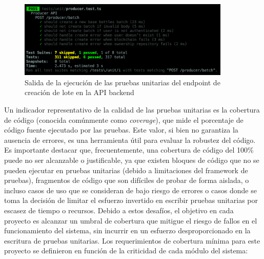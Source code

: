 \begin{figure}[!htb]
	\centering
	\includegraphics[width=0.9\textwidth]{Figures/unit-test-api-results.png}
	\caption{Salida de la ejecución de las pruebas unitarias del \gls{endpoint} de creación de lote en la API backend}
	\label{fig:unit-test-api-results}
\end{figure}

Un indicador representativo de la calidad de las pruebas unitarias es la cobertura de código (conocida comúnmente como \textit{\gls{coverage}}), que mide el porcentaje de código fuente ejecutado por las pruebas. Este valor, si bien no garantiza la ausencia de errores, es una herramienta útil para evaluar la robustez del código. Es importante destacar que, frecuentemente, una cobertura de código del 100\% puede no ser alcanzable o justificable, ya que existen bloques de código que no se pueden ejecutar en pruebas unitarias (debido a limitaciones del framework de pruebas), fragmentos de código que son difíciles de probar de forma aislada, o incluso casos de uso que se consideran de bajo riesgo de errores o casos donde se toma la decisión de limitar el esfuerzo invertido en escribir pruebas unitarias por escasez de tiempo o recursos. Debido a estos desafíos, el objetivo en cada proyecto es alcanzar un umbral de cobertura que mitigue el riesgo de fallos en el funcionamiento del sistema, sin incurrir en un esfuerzo desproporcionado en la escritura de pruebas unitarias. Los requerimientos de cobertura mínima para este proyecto se definieron en función de la criticidad de cada módulo del sistema:

